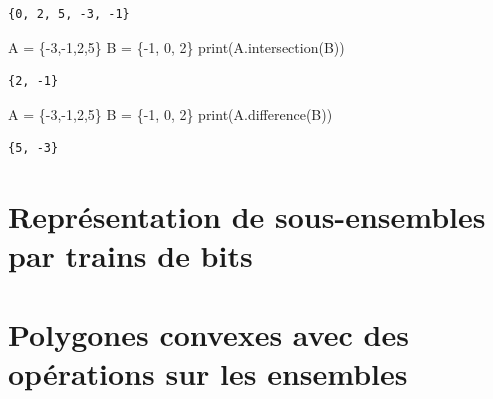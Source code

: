 \documentclass[
  letterpaper,
]{scrbook}
\newenvironment{Shaded}{}{}
\newcommand{\BuiltInTok}[1]{#1}
\newcommand{\DecValTok}[1]{\textcolor[rgb]{0.25,0.63,0.44}{#1}}
\newcommand{\NormalTok}[1]{#1}
\newcommand{\OperatorTok}[1]{\textcolor[rgb]{0.40,0.40,0.40}{#1}}
\theoremstyle{plain}
\theoremstyle{definition}
\theoremstyle{definition}
\theoremstyle{remark}
\begin{document}
\begin{verbatim}
{0, 2, 5, -3, -1}
\end{verbatim}

\hypertarget{intersection-python}{}
\begin{Shaded}
\begin{Highlighting}[]
\NormalTok{A }\OperatorTok{=}\NormalTok{ \{}\OperatorTok{{-}}\DecValTok{3}\NormalTok{,}\OperatorTok{{-}}\DecValTok{1}\NormalTok{,}\DecValTok{2}\NormalTok{,}\DecValTok{5}\NormalTok{\}}
\NormalTok{B }\OperatorTok{=}\NormalTok{ \{}\OperatorTok{{-}}\DecValTok{1}\NormalTok{, }\DecValTok{0}\NormalTok{, }\DecValTok{2}\NormalTok{\}}
\BuiltInTok{print}\NormalTok{(A.intersection(B))}
\end{Highlighting}
\end{Shaded}

\begin{verbatim}
{2, -1}
\end{verbatim}

\hypertarget{difference-python}{}
\begin{Shaded}
\begin{Highlighting}[]
\NormalTok{A }\OperatorTok{=}\NormalTok{ \{}\OperatorTok{{-}}\DecValTok{3}\NormalTok{,}\OperatorTok{{-}}\DecValTok{1}\NormalTok{,}\DecValTok{2}\NormalTok{,}\DecValTok{5}\NormalTok{\}}
\NormalTok{B }\OperatorTok{=}\NormalTok{ \{}\OperatorTok{{-}}\DecValTok{1}\NormalTok{, }\DecValTok{0}\NormalTok{, }\DecValTok{2}\NormalTok{\}}
\BuiltInTok{print}\NormalTok{(A.difference(B))}
\end{Highlighting}
\end{Shaded}

\begin{verbatim}
{5, -3}
\end{verbatim}

\hypertarget{repruxe9sentation-de-sous-ensembles-par-trains-de-bits}{%
\section{Représentation de sous-ensembles par trains de
bits}\label{repruxe9sentation-de-sous-ensembles-par-trains-de-bits}}

\hypertarget{polygones-convexes-avec-des-opuxe9rations-sur-les-ensembles}{%
\section{Polygones convexes avec des opérations sur les
ensembles}\label{polygones-convexes-avec-des-opuxe9rations-sur-les-ensembles}}
\end{document}
